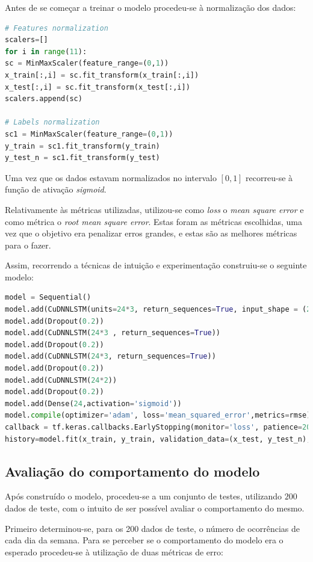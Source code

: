 \documentclass[a4paper, 12pt]{article}
\begin{document}
Antes de se começar a treinar o modelo procedeu-se à normalização dos dados:

\begin{lstlisting}[language=Python]
# Features normalization
scalers=[]
for i in range(11):
sc = MinMaxScaler(feature_range=(0,1))
x_train[:,i] = sc.fit_transform(x_train[:,i])
x_test[:,i] = sc.fit_transform(x_test[:,i])
scalers.append(sc)

# Labels normalization
sc1 = MinMaxScaler(feature_range=(0,1))
y_train = sc1.fit_transform(y_train)
y_test_n = sc1.fit_transform(y_test)
\end{lstlisting}

Uma vez que os dados estavam normalizados no intervalo $[0,1]$ recorreu-se à função de ativação \textit{sigmoid}.

Relativamente às métricas utilizadas, utilizou-se como \textit{loss} o \textit{mean square error} e como métrica o \textit{root mean square error}. Estas foram as métricas escolhidas, uma vez que o  objetivo era penalizar erros grandes, e estas são as melhores métricas para o fazer.

Assim, recorrendo a técnicas de intuição e experimentação construiu-se o seguinte modelo:

\begin{lstlisting}[language=Python]
model = Sequential()
model.add(CuDNNLSTM(units=24*3, return_sequences=True, input_shape = (24*3,11) ) )
model.add(Dropout(0.2))
model.add(CuDNNLSTM(24*3 , return_sequences=True))
model.add(Dropout(0.2))
model.add(CuDNNLSTM(24*3, return_sequences=True))
model.add(Dropout(0.2))
model.add(CuDNNLSTM(24*2))
model.add(Dropout(0.2))
model.add(Dense(24,activation='sigmoid'))
model.compile(optimizer='adam', loss='mean_squared_error',metrics=rmse)
callback = tf.keras.callbacks.EarlyStopping(monitor='loss', patience=20)
history=model.fit(x_train, y_train, validation_data=(x_test, y_test_n), epochs=1000, callbacks=[callback])
\end{lstlisting}

\subsection{Avaliação do comportamento do modelo}

Após construído o modelo, procedeu-se a um conjunto de testes, utilizando $200$ dados de teste, com o intuito de ser possível avaliar o comportamento do mesmo.

Primeiro determinou-se, para os 200 dados de teste, o número de ocorrências de cada dia da semana.
Para se perceber se o comportamento do modelo era o esperado procedeu-se à utilização de duas métricas de erro:
\end{document}
